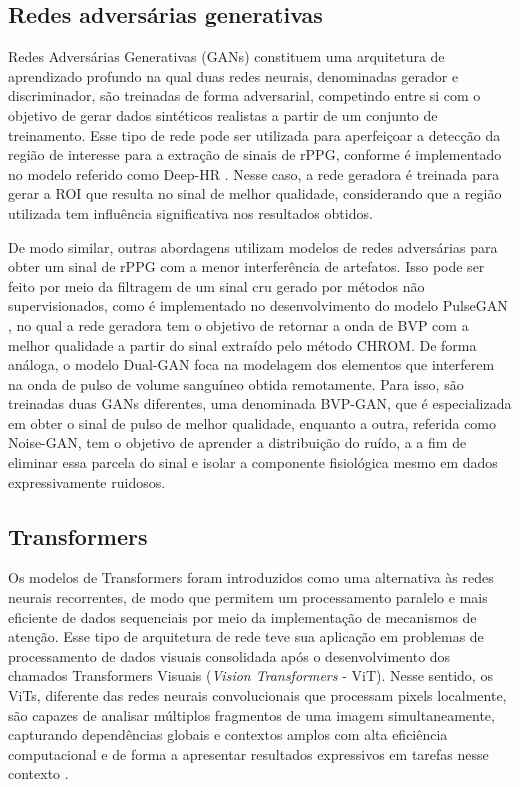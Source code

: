 \subsection{Redes adversárias generativas}

Redes Adversárias Generativas (GANs) constituem uma arquitetura de aprendizado profundo na qual duas redes neurais, denominadas gerador e discriminador, são treinadas de forma adversarial, competindo entre si com o objetivo de gerar dados sintéticos realistas a partir de um conjunto de treinamento. Esse tipo de rede pode ser utilizada para aperfeiçoar a detecção da região de interesse para a extração de sinais de rPPG, conforme é implementado no modelo referido como Deep-HR \cite{Sabokrou2021deephr}. Nesse caso, a rede geradora é treinada para gerar a ROI que resulta no sinal de melhor qualidade, considerando que a região utilizada tem influência significativa nos resultados obtidos. 

De modo similar, outras abordagens utilizam modelos de redes adversárias para obter um sinal de rPPG com a menor interferência de artefatos. Isso pode ser feito por meio da filtragem de um sinal cru gerado por métodos não supervisionados, como é implementado no desenvolvimento do modelo PulseGAN \cite{Song2021pulsegan}, no qual a rede geradora tem o objetivo de retornar a onda de BVP com a melhor qualidade a partir do sinal extraído pelo método CHROM. De forma análoga, o modelo Dual-GAN \cite{Lu2021dualgan} foca na modelagem dos elementos que interferem na onda de pulso de volume sanguíneo obtida remotamente. Para isso, são treinadas duas GANs diferentes, uma denominada BVP-GAN, que é especializada em obter o sinal de pulso de melhor qualidade, enquanto a outra, referida como Noise-GAN, tem o objetivo de aprender a distribuição do ruído, a a fim de eliminar essa parcela do sinal e isolar a componente fisiológica mesmo em dados expressivamente ruidosos.

\subsection{Transformers}

Os modelos de Transformers foram introduzidos como uma alternativa às redes neurais recorrentes, de modo que permitem um processamento paralelo e mais eficiente de dados sequenciais por meio da implementação de mecanismos de atenção. Esse tipo de arquitetura de rede teve sua aplicação em problemas de processamento de dados visuais consolidada após o desenvolvimento dos chamados Transformers Visuais (\textit{Vision Transformers} - ViT). Nesse sentido, os ViTs, diferente das redes neurais convolucionais que processam pixels localmente, são capazes de analisar múltiplos fragmentos de uma imagem simultaneamente, capturando dependências globais e contextos amplos com alta eficiência computacional e de forma a apresentar resultados expressivos em tarefas nesse contexto \cite{dosovitskiy2021imageworth16x16words}. 

